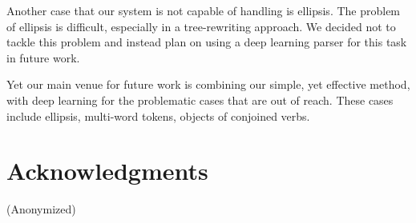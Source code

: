 \documentclass[11pt,a4paper]{article}
\begin{document}
Another case that our system is not capable of handling is
ellipsis. The problem of ellipsis is difficult, especially in a
tree-rewriting approach. We decided not to tackle this problem and
instead plan on using a deep learning parser for this task in future work.

Yet our main venue for future work is combining our simple, yet effective
method, with deep learning for the problematic cases that are out of
reach. These cases include ellipsis, multi-word tokens, objects of
conjoined verbs.



    
\section*{Acknowledgments}

(Anonymized)



\end{document}
